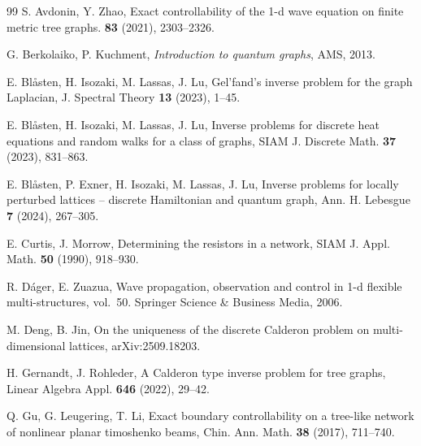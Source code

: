 \documentclass[11pt]{amsart}
\theoremstyle{definition}
\theoremstyle{plain}
\numberwithin{equation}{section}
\begin{document}
\begin{thebibliography}{99}
S. Avdonin, Y. Zhao,
\newblock Exact controllability of the 1-d wave equation on finite metric tree graphs.
 {\bf 83} (2021), 2303--2326.
 



G. Berkolaiko, P. Kuchment,
\textit{Introduction to quantum graphs}, AMS, 2013.

E. Bl{\aa}sten, H. Isozaki, M. Lassas, J. Lu, Gel’fand’s inverse problem for the graph Laplacian, J. Spectral Theory {\bf 13} (2023), 1--45.

E. Bl{\aa}sten, H. Isozaki, M. Lassas, J. Lu, Inverse problems for discrete heat equations and random walks for a class of
graphs, SIAM J. Discrete Math. {\bf 37} (2023), 831--863.



E. Bl{\aa}sten, P. Exner, H. Isozaki, M. Lassas, J. Lu, Inverse problems for locally perturbed lattices – discrete Hamiltonian and quantum graph, Ann. H. Lebesgue {\bf 7} (2024), 267--305.




E. Curtis, J. Morrow, Determining the resistors in a network, SIAM J. Appl. Math. \textbf{50} (1990), 918--930.

  
R. D{\'a}ger, E. Zuazua, Wave propagation, observation and control in 1-d flexible multi-structures, vol.~50.
\newblock Springer Science \& Business Media, 2006.


M. Deng, B. Jin, On the uniqueness of the discrete Calderon problem on multi-dimensional lattices, arXiv:2509.18203.


H. Gernandt, J. Rohleder, A Calderon type inverse problem for tree graphs, Linear Algebra Appl. \textbf{646} (2022), 29--42.


Q. Gu, G. Leugering, T. Li, {Exact boundary controllability on a tree-like network of nonlinear planar timoshenko beams}, Chin. Ann. Math. \textbf{38} (2017), 711--740.


\end{thebibliography}
\end{document}
